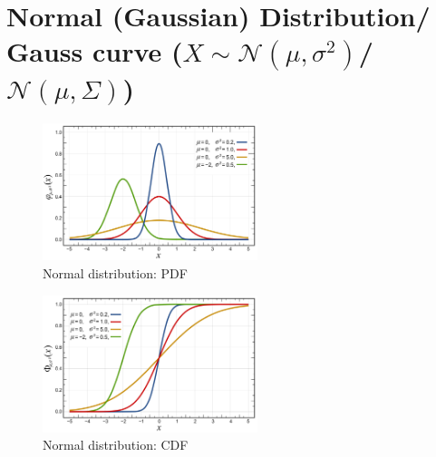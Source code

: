 \chapter{Normal (Gaussian) Distribution/ Gauss curve ($X \sim \mathcal{N}(\mu,\sigma^2)$/ $\mathcal{N}(\mu, \Sigma)$) \cite{ism-1,mfml-1,wiki/Normal_distribution}} \label{Normal (Gaussian) Distribution}

\begin{table}[H]
    \begin{minipage}{0.49\linewidth}
        \begin{figure}[H]
            \centering
            \includegraphics[width=\linewidth, height=4cm, keepaspectratio]{Pictures/distributions/Normal_Distribution_PDF.jpg}
            \caption{Normal distribution: PDF}
        \end{figure}
    \end{minipage}
    \hfill
    \begin{minipage}{0.49\linewidth}
        \begin{figure}[H]
            \centering
            \includegraphics[width=\linewidth, height=4cm, keepaspectratio]{Pictures/distributions/Normal_Distribution_CDF.jpg}
            \caption{Normal distribution: CDF}
        \end{figure}
    \end{minipage}
\end{table}

